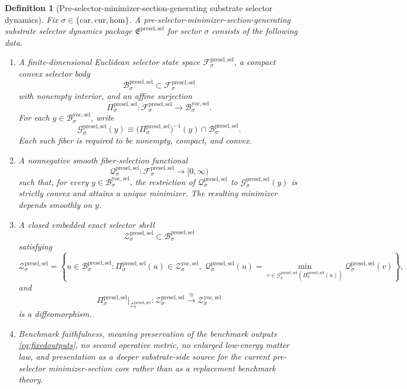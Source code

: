 \documentclass[11pt]{article}
\newcommand{\Car}{\mathrm{car}}
\newcommand{\Cur}{\mathrm{cur}}
\newcommand{\Hom}{\mathrm{hom}}
\newcommand{\YoctoSelectorBody}[1]{\mathcal B_{#1}^{\mathrm{yoc,sel}}}
\newcommand{\YoctoSelectorShell}[1]{\mathcal Z_{#1}^{\mathrm{yoc,sel}}}
\newcommand{\PreSectionSelectorPackage}{\mathfrak E^{\mathrm{presel,sel}}}
\newcommand{\PreSectionSelectorSpace}[1]{\mathcal F_{#1}^{\mathrm{presel,sel}}}
\newcommand{\PreSectionSelectorBody}[1]{\mathcal B_{#1}^{\mathrm{presel,sel}}}
\newcommand{\PreSectionSelectorProj}[1]{\Pi_{#1}^{\mathrm{presel,sel}}}
\newcommand{\PreSectionSelectorFiber}[2]{\mathcal G_{#1}^{\mathrm{presel,sel}}(#2)}
\newcommand{\PreSectionSelectorFunctional}[1]{\mathscr Q_{#1}^{\mathrm{presel,sel}}}
\newcommand{\PreSectionSelectorShell}[1]{\mathcal Z_{#1}^{\mathrm{presel,sel}}}
\newtheorem{definition}{Definition}
\begin{document}
\begin{definition}[Pre-selector-minimizer-section-generating substrate selector dynamics]
\label{def:selector}
Fix \(\sigma\in\{\Car,\Cur,\Hom\}\). A \emph{pre-selector-minimizer-section-generating substrate selector dynamics package} \(\PreSectionSelectorPackage\) for sector \(\sigma\) consists of the following data.
\begin{enumerate}
    \item A finite-dimensional Euclidean selector state space \(\PreSectionSelectorSpace{\sigma}\), a compact convex selector body
    \[
    \PreSectionSelectorBody{\sigma}\subset\PreSectionSelectorSpace{\sigma}
    \]
    with nonempty interior, and an affine surjection
    \[
    \PreSectionSelectorProj{\sigma}:\PreSectionSelectorSpace{\sigma}\to\YoctoSelectorBody{\sigma}.
    \]
    For each \(y\in\YoctoSelectorBody{\sigma}\), write
    \[
    \PreSectionSelectorFiber{\sigma}{y}
    \equiv
    \bigl(\PreSectionSelectorProj{\sigma}\bigr)^{-1}(y)\cap\PreSectionSelectorBody{\sigma}.
    \]
    Each such fiber is required to be nonempty, compact, and convex.
    \item A nonnegative smooth fiber-selection functional
    \[
    \PreSectionSelectorFunctional{\sigma}:\PreSectionSelectorSpace{\sigma}\to[0,\infty)
    \]
    such that, for every \(y\in\YoctoSelectorBody{\sigma}\), the restriction of \(\PreSectionSelectorFunctional{\sigma}\) to \(\PreSectionSelectorFiber{\sigma}{y}\) is strictly convex and attains a unique minimizer. The resulting minimizer depends smoothly on \(y\).
    \item A closed embedded exact selector shell
    \[
    \PreSectionSelectorShell{\sigma}\subset\PreSectionSelectorBody{\sigma}
    \]
    satisfying
    \[
    \PreSectionSelectorShell{\sigma}
    =
    \left\{
    u\in\PreSectionSelectorBody{\sigma}:
    \PreSectionSelectorProj{\sigma}(u)\in\YoctoSelectorShell{\sigma},
    \;
    \PreSectionSelectorFunctional{\sigma}(u)
    =
    \min_{v\in\PreSectionSelectorFiber{\sigma}{\PreSectionSelectorProj{\sigma}(u)}}
    \PreSectionSelectorFunctional{\sigma}(v)
    \right\},
    \]
    and
    \[
    \PreSectionSelectorProj{\sigma}\big|_{\PreSectionSelectorShell{\sigma}}
    :
    \PreSectionSelectorShell{\sigma}\xrightarrow{\cong}\YoctoSelectorShell{\sigma}
    \]
    is a diffeomorphism.
    \item Benchmark faithfulness, meaning preservation of the benchmark outputs \eqref{eq:fixedoutputs}, no second operative metric, no enlarged low-energy matter law, and presentation as a deeper substrate-side source for the current pre-selector minimizer-section core rather than as a replacement benchmark theory.
\end{enumerate}
\end{definition}
\end{document}
